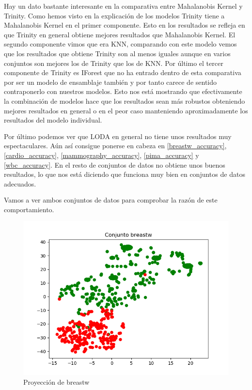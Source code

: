 Hay un dato bastante interesante en la comparativa entre Mahalanobis Kernel y Trinity. Como hemos visto en la explicación de los modelos Trinity tiene a Mahalanobis Kernel en el primer componente. Esto en los resultados se refleja en que Trinity en general obtiene mejores resultados que Mahalanobis Kernel. El segundo componente vimos que era KNN, comparando con este modelo vemos que los resultados que obtiene Trinity son al menos iguales aunque en varios conjuntos son mejores los de Trinity que los de KNN. Por último el tercer componente de Trinity es IForest que no ha entrado dentro de esta comparativa por ser un modelo de ensamblaje también y por tanto carece de sentido contraponerlo con nuestros modelos. Esto nos está mostrando que efectivamente la combinación de modelos hace que los resultados sean más robustos obteniendo mejores resultados en general o en el peor caso manteniendo aproximadamente los resultados del modelo individual.

Por último podemos ver que LODA en general no tiene unos resultados muy espectaculares. Aún así consigue ponerse en cabeza en \ref{breastw_accuracy}, \ref{cardio_accuracy}, \ref{mammography_accuracy}, \ref{pima_accuracy} y \ref{wbc_accuracy}. En el resto de conjuntos de datos no obtiene unos buenos resultados, lo que nos está diciendo que funciona muy bien en conjuntos de datos adecuados.

Vamos a ver ambos conjuntos de datos para comprobar la razón de este comportamiento.

\begin{figure}[H]
	\centering
	\label{breastw}
	\includegraphics[scale=0.7]{imagenes/breastw}
	\caption{Proyección de breastw}
\end{figure}

